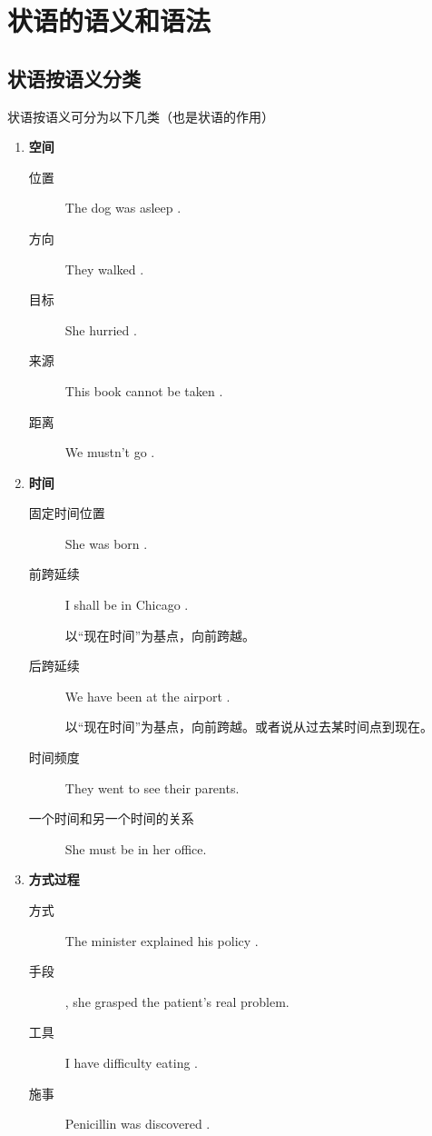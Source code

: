\chapter{状语的语义和语法}

\section{状语按语义分类}

状语按语义可分为以下几类（也是状语的作用）
\begin{enumerate}
\item \textbf{空间}

  \begin{description}
  \item[位置] The dog was asleep .
  \item[方向] They walked .
  \item[目标] She hurried .
  \item[来源] This book cannot be taken .
  \item[距离] We mustn't go .
  \end{description}
\item \textbf{时间}

  \begin{description}
  \item[固定时间位置] She was born .
  \item[前跨延续] I shall be in Chicago .

    以“现在时间”为基点，向前跨越。
  \item[后跨延续] We have been at the airport .

    以“现在时间”为基点，向前跨越。或者说从过去某时间点到现在。

  \item[时间频度] They  went to see their parents.
  \item [一个时间和另一个时间的关系] She must  be in her office.
  \end{description}

\item \textbf{方式过程}

  \begin{description}
  \item[方式] The minister explained his policy .
  \item[手段] , she grasped the patient's real problem.
  \item[工具] I have difficulty eating .
  \item[施事] Penicillin was discovered .
  \end{description}


\end{enumerate}
